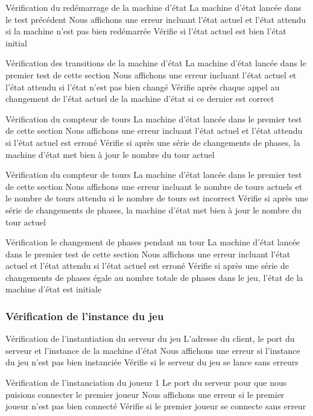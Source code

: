 \mytest
{Vérification du redémarrage de la machine d'état}
{La machine d'état lancée dans le test précédent}
{Nous affichons une erreur incluant l'état actuel et l'état attendu si la machine n'est pas bien redémarrée}
{Vérifie si l'état actuel est bien l'état initial}

\mytest
{Vérification des transitions de la machine d'état}
{La machine d'état lancée dans le premier test de cette section}
{Nous affichons une erreur incluant l'état actuel et l'état attendu si l'état n'est pas bien changé}
{Vérifie après chaque appel au changement de l'état actuel de la machine d'état si ce dernier est correct}

\mytest
{Vérification du compteur de tours}
{La machine d'état lancée dans le premier test de cette section}
{Nous affichons une erreur incluant l'état actuel et l'état attendu si l'état actuel est erroné}
{Vérifie si après une série de changements de phases, la machine d'état met bien à jour le nombre du tour actuel}

\mytest
{Vérification du compteur de tours}
{La machine d'état lancée dans le premier test de cette section}
{Nous affichons une erreur incluant le nombre de tours actuels et le nombre de tours attendu si le nombre de tours est incorrect}
{Vérifie si après une série de changements de phases, la machine d'état met bien à jour le nombre du tour actuel}

\mytest
{Vérification le changement de phases pendant un tour}
{La machine d'état lancée dans le premier test de cette section}
{Nous affichons une erreur incluant l'état actuel et l'état attendu si l'état actuel est erroné}
{Vérifie si après une série de changements de phases égale au nombre totale de phases dans le jeu, l'état de la machine d'état est initiale}

\subsubsection{Vérification de l'instance du jeu}

\mytest
{Vérification de l'instantiation du serveur du jeu}
{L'adresse du client, le port du serveur et l'instance de la machine d'état}
{Nous affichons une erreur si l'instance du jeu n'est pas bien instanciée}
{Vérifie si le serveur du jeu se lance sans erreurs}

\mytest
{Vérification de l'instanciation du joueur 1}
{Le port du serveur pour que nous puisions connecter le premier joueur}
{Nous affichons une erreur si le premier joueur n'est pas bien connecté}
{Vérifie si le premier joueur se connecte sans erreur}


